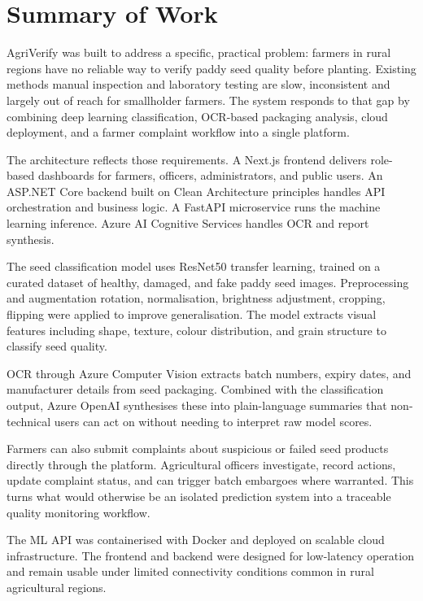 
\section{Summary of Work}

AgriVerify was built to address a specific, practical problem: farmers in rural regions have no reliable way to verify paddy seed quality before planting. Existing methods manual inspection and laboratory testing are slow, inconsistent and largely out of reach for smallholder farmers. The system responds to that gap by combining deep learning classification, OCR-based packaging analysis, cloud deployment, and a farmer complaint workflow into a single platform.

The architecture reflects those requirements. A Next.js frontend delivers role-based dashboards for farmers, officers, administrators, and public users. An ASP.NET Core backend built on Clean Architecture principles handles API orchestration and business logic. A FastAPI microservice runs the machine learning inference. Azure AI Cognitive Services handles OCR and report synthesis.

The seed classification model uses ResNet50 transfer learning, trained on a curated dataset of healthy, damaged, and fake paddy seed images. Preprocessing and augmentation rotation, normalisation, brightness adjustment, cropping, flipping were applied to improve generalisation. The model extracts visual features including shape, texture, colour distribution, and grain structure to classify seed quality.

OCR through Azure Computer Vision extracts batch numbers, expiry dates, and manufacturer details from seed packaging. Combined with the classification output, Azure OpenAI synthesises these into plain-language summaries that non-technical users can act on without needing to interpret raw model scores.

Farmers can also submit complaints about suspicious or failed seed products directly through the platform. Agricultural officers investigate, record actions, update complaint status, and can trigger batch embargoes where warranted. This turns what would otherwise be an isolated prediction system into a traceable quality monitoring workflow.

The ML API was containerised with Docker and deployed on scalable cloud infrastructure. The frontend and backend were designed for low-latency operation and remain usable under limited connectivity conditions common in rural agricultural regions.

